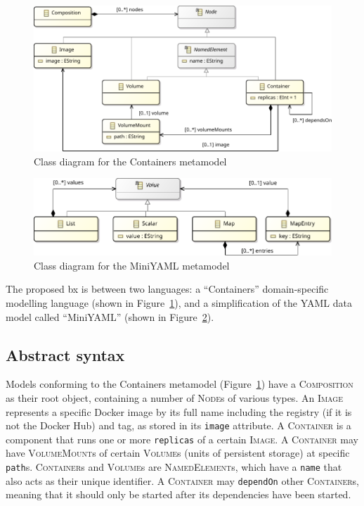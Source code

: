 \documentclass[twocolumn]{ceurart}
\begin{document}
\begin{figure}
  \centering
  \includegraphics[width=\columnwidth]{containers-metamodel}
  \caption{Class diagram for the Containers metamodel}%
  \label{fig:containers-metamodel}
\end{figure}

\begin{figure}
  \centering
  \includegraphics[width=\columnwidth]{miniyaml-metamodel}
  \caption{Class diagram for the MiniYAML metamodel}%
  \label{fig:miniyaml-metamodel}
\end{figure}

The proposed bx is between two languages: a ``Containers'' domain-specific
modelling language (shown in Figure~\ref{fig:containers-metamodel}), and a
simplification of the YAML data model called ``MiniYAML'' (shown in
Figure~\ref{fig:miniyaml-metamodel}).

\subsection{Abstract syntax}
\label{sec:abstract-syntax}

\newcommand*{\metaclass}[1]{\textsc{#1}}
\newcommand*{\feature}[1]{\texttt{#1}}

Models conforming to the Containers metamodel
(Figure~\ref{fig:containers-metamodel}) have a \metaclass{Composition} as their
root object, containing a number of \metaclass{Node}s of various types. An
\metaclass{Image} represents a specific Docker image by its full name including
the registry (if it is not the Docker Hub) and tag, as stored in its
\feature{image} attribute. A \metaclass{Container} is a component that runs one
or more \feature{replicas} of a certain \metaclass{Image}. A
\metaclass{Container} may have \metaclass{Volume\-Mount}s of certain
\metaclass{Volume}s (units of persistent storage) at specific \feature{path}s.
\metaclass{Container}s and \metaclass{Volume}s are \metaclass{NamedElement}s,
which have a \feature{name} that also acts as their unique identifier. A
\metaclass{Container} may \feature{dependOn} other \metaclass{Container}s,
meaning that it should only be started after its dependencies have been started.
\end{document}
